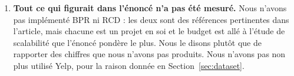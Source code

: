 \begin{enumerate}
compare bien à une référence par force brute) et par le fait que le notebook
s'exécute jusqu'au bout. Cela a suffi à attraper de vrais bugs - notamment un
\texttt{PYTHONPATH} manquant sur les workers - mais ce n'est pas un substitut à des
tests.
\item \textbf{Tout ce qui figurait dans l'énoncé n'a pas été mesuré.} Nous n'avons
pas implémenté BPR ni RCD : les deux sont
des références pertinentes dans l'article, mais chacune est un projet en soi et le
budget est allé à l'étude de scalabilité que l'énoncé pondère le plus. Nous le disons
plutôt que de rapporter des chiffres que nous n'avons pas produits. Nous n'avons pas
non plus utilisé Yelp, pour la raison donnée en Section~\ref{sec:dataset}.
\end{enumerate}
